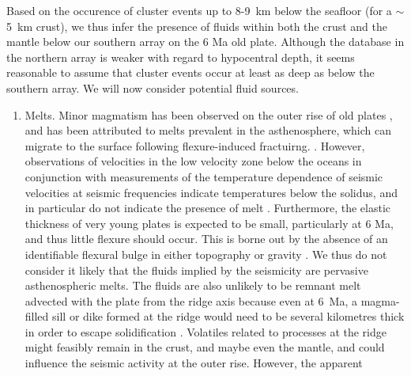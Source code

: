 \documentclass[reviewcopy]{elsarticle}
\begin{document}
Based on the occurence of cluster events up to 8-9~km below the
seafloor (for a $\sim$5~km crust), we thus infer
the presence of fluids within both the crust and the  mantle below our southern
array on the 6 Ma old plate.
Although the database in the northern array is
weaker with regard to hypocentral depth, it seems reasonable to assume that cluster events
occur at least as deep as below the southern array. We will now
consider potential fluid sources.
\begin{enumerate}
\item Melts. Minor magmatism has been observed on the outer rise of
  old plates \citep{hirano04}, and has been attributed to
  melts prevalent in the asthenosphere, which can migrate to the
  surface following flexure-induced fractuirng.
  \citep{hirano06}.   However, observations of velocities in
  the low velocity zone below the oceans  in conjunction with
  measurements of the temperature dependence of seismic velocities at
  seismic frequencies indicate temperatures below the solidus, and in
  particular do not indicate the presence of melt \citep{priestley05,faul05}.
   Furthermore, the elastic thickness of very young plates
   is expected to be small, particularly at 6 Ma, and thus little flexure should
  occur.   This   is borne out by the absence of an identifiable flexural bulge in either topography or
  gravity \citep[e.g.][]{bry03}.   We thus do not consider it likely that
  the fluids implied by the seismicity are pervasive asthenospheric
  melts.  The fluids are also unlikely to be remnant melt advected
  with the plate from the ridge axis because
  even at 6~Ma, a magma-filled sill or dike formed
  at the ridge would need to be several kilometres thick in order to
  escape solidification \citep{turcotte02}.
%
 Volatiles related to processes at the ridge might feasibly
  remain in the crust, and maybe even the mantle, and could influence
  the  seismic activity at the outer rise.  However, the apparent

\end{enumerate}
\end{document}

